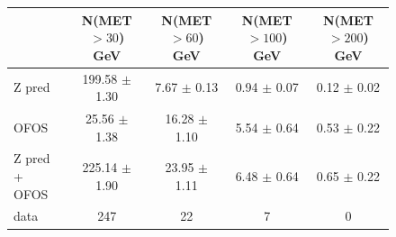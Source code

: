 \begin{figure}[hbtp]
  \begin{center}

	\medskip 

    \begin{tabular}{lcccc}
\hline

                        &   N(MET $>30$)  GeV    &   N(MET $>60$)  GeV    &   N(MET $>100$) GeV    &   N(MET $>200$) GeV \\
\hline
              Z pred    & 199.58  $\pm$  1.30    &   7.67  $\pm$  0.13    &    0.94 $\pm$  0.07    &   0.12  $\pm$  0.02 \\
                OFOS    &  25.56  $\pm$  1.38    &  16.28  $\pm$  1.10    &    5.54 $\pm$  0.64    &   0.53  $\pm$  0.22 \\
\hline
       Z pred + OFOS    & 225.14  $\pm$  1.90    &  23.95  $\pm$  1.11    &    6.48 $\pm$  0.64    &   0.65  $\pm$  0.22 \\
\hline
                   data &   247                  &    22                  &     7                  &     0 \\

\hline
    \end{tabular}


\end{center}
\end{figure}
